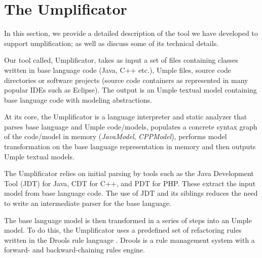 

\section{The Umplificator}
\label{chap:tool}
In this section, we provide a detailed description of the tool we have developed to support umplification; as well as discuss some of its technical details.

Our tool called, Umplificator, takes as input  a set of files containing classes written in base language code (Java, C++ etc.), Umple files, source code directories or software projects (source code containers as represented in many popular IDEs such as Eclipse). The output is an Umple textual model containing base language code with modeling abstractions. 


At its core, the Umplificator is a language interpreter and static analyzer that parses base language and Umple code/models, populates a concrete syntax graph of the code/model in memory (\textit{JavaModel}, \textit{CPPModel}), performs model transformation on the base language representation in memory and then outputs Umple textual models.

The Umplificator relies on initial parsing by tools such as the Java Development Tool (JDT) for Java, CDT for C++, and PDT for PHP. These extract the input model from base language code. The use of JDT and its siblings reduces the need to write an intermediate parser for the base language.

The base language model is then transformed in a series of steps into an Umple model. To do this, the Umplificator uses a predefined set of refactoring rules written in the Drools rule language \cite{Drools_Book}. Drools is a rule management system with a forward- and backward-chaining rules engine. 


